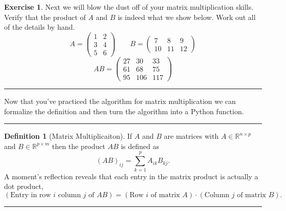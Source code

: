 \documentclass[
]{book}
\theoremstyle{definition}
\newtheorem{definition}{Definition}[chapter]
\theoremstyle{definition}
\theoremstyle{definition}
\newtheorem{exercise}{Exercise}[chapter]
\theoremstyle{remark}
\begin{document}
\begin{exercise}
\protect\hypertarget{exr:unnamed-chunk-299}{}{\label{exr:unnamed-chunk-299} }Next we will blow the dust off of your matrix multiplication skills. Verify that the product of \(A\) and \(B\) is indeed what we show below. Work out all of the details by hand.
\[ A = \begin{pmatrix} 1 & 2 \\ 3 & 4 \\ 5 & 6 \end{pmatrix} \qquad B = \begin{pmatrix} 7 & 8 & 9 \\ 10 & 11 & 12 \end{pmatrix} \]
\[ AB = \begin{pmatrix} 27 & 30 & 33 \\ 61 & 68 & 75 \\ 95 & 106 & 117 \end{pmatrix} \]
\end{exercise}

\begin{center}\rule{0.5\linewidth}{0.5pt}\end{center}

Now that you've practiced the algorithm for matrix multiplication we can formalize the definition and then turn the algorithm into a Python function.

\begin{center}\rule{0.5\linewidth}{0.5pt}\end{center}

\begin{definition}[Matrix Multiplicaiton]
\protect\hypertarget{def:unnamed-chunk-300}{}{\label{def:unnamed-chunk-300} {} }If \(A\) and \(B\) are matrices with \(A \in \mathbb{R}^{n \times p}\) and \(B \in \mathbb{R}^{p \times m}\) then the product \(AB\) is defined as
\[ \left( AB \right)_{ij} = \sum_{k=1}^p A_{ik} B_{kj}.\]
A moment's reflection reveals that each entry in the matrix product is actually a dot product,
\[ \left( \text{Entry in row $i$ column $j$ of $AB$} \right) = \left( \text{Row $i$ of matrix $A$} \right) \cdot \left( \text{Column $j$ of matrix $B$} \right).\]
\end{definition}

\begin{center}\rule{0.5\linewidth}{0.5pt}\end{center}
\end{document}
